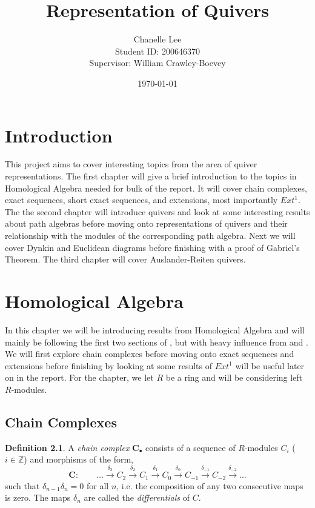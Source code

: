 \documentclass[11.5pt, twoside, a4paper, titlepage]{report}
\theoremstyle{definition}
\newtheorem{mydef}{Definition}[section]
\theoremstyle{plain}
\begin{document}
\title{Representation of Quivers}
\author{Chanelle Lee \\Student ID: 200646370\\Supervisor: William Crawley-Boevey}
\date{\today}
\maketitle


\tableofcontents

\chapter{Introduction}

This project aims to cover interesting topics from the area of quiver representations. The first chapter will give a brief introduction to the topics in Homological Algebra needed for bulk of the report. It will cover chain complexes, exact sequences, short exact sequences, and extensions, most importantly $Ext^1$. The the second chapter will introduce quivers and look at some interesting results about path algebras before moving onto representations of quivers and their relationship with the modules of the corresponding path algebra. Next we will cover Dynkin and Euclidean diagrams before finishing with a proof of Gabriel's Theorem. The third chapter will cover Auslander-Reiten quivers.

\chapter{Homological Algebra}

In this chapter we will be introducing results from Homological Algebra and will mainly be following the first two sections of \cite{CB1}, but with heavy influence from \cite{Rotman} and \cite{Weibel}. We will first explore chain complexes before moving onto exact sequences and extensions before finishing by looking at some results of $Ext^1$ will be useful later on in the report. For the chapter, we let $R$ be a ring and will be considering left $R$-modules.

\section{Chain Complexes}

\begin{mydef}
A \emph{chain complex} $\mathbf{C}_{\bullet}$ consists of a sequence of $R$-modules $C_i$ ($i \in \mathbb{Z}$) and morphisms of the form,
\begin{equation*}
\mathbf{C}: \qquad \dots \xrightarrow{\delta_{3}} C_2 \xrightarrow{\delta_{2}} C_1 \xrightarrow{\delta_{1 }} C_0 \xrightarrow{\delta_0} C_{-1} \xrightarrow{\delta_{-1}} C_{-2} \xrightarrow{\delta_{-2}}\dots
\end{equation*}
such that $\delta_{n-1}\delta_{n}=0$ for all $n$, i.e. the composition of any two consecutive maps is zero. The maps $\delta_n$ are called the \emph{differentials} of $C$.
\end{mydef}
\end{document}

